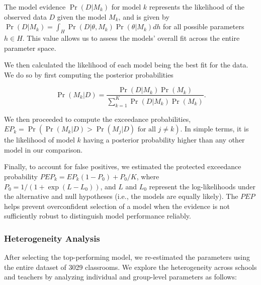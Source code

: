 \documentclass[
  number,
  preprint,
  3p,
  onecolumn]{elsarticle}
\begin{document}
The model evidence \(\Pr(D | M_k)\) for model \(k\) represents the
likelihood of the observed data \(D\) given the model \(M_k\), and is
given by \(\Pr(D|M_k) = \int_{H} \Pr(D|\theta, M_k) \Pr(\theta|M_k) dh\)
for all possible parameters \(h \in H\). This value allows us to assess
the models' overall fit across the entire parameter space.

We then calculated the likelihood of each model being the best fit for
the data. We do so by first computing the posterior probabilities

\[
\Pr(M_k|D) = \frac{\Pr(D|M_k)\Pr(M_k)}{\sum_{k=1}^K \Pr(D|M_k)\Pr(M_k)}.
\]

We then proceeded to compute the exceedance probabilities,
\(EP_k = \Pr(\Pr(M_k|D) > \Pr(M_j|D) \text{ for all } j \neq k)\). In
simple terms, it is the likelihood of model \(k\) having a posterior
probability higher than any other model in our comparison.

Finally, to account for false positives, we estimated the protected
exceedance probability \(PEP_k = EP_k(1 - P_0) + P_0/K\), where
\(P_0 = 1/(1 + \exp(L - L_0))\), and \(L\) and \(L_0\) represent the
log-likelihoods under the alternative and null hypotheses (i.e., the
models are equally likely). The \(PEP\) helps prevent overconfident
selection of a model when the evidence is not sufficiently robust to
distinguish model performance reliably.

\subsubsection{Heterogeneity Analysis}\label{heterogeneity-analysis}

After selecting the top-performing model, we re-estimated the parameters
using the entire dataset of 3029 classrooms. We explore the
heterogeneity across schools and teachers by analyzing individual and
group-level parameters as follows:
\end{document}
